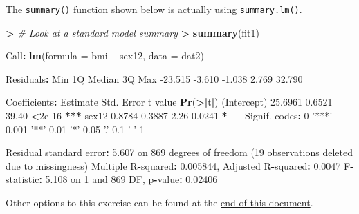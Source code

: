 \documentclass[
]{book}
\newenvironment{Shaded}{\begin{snugshade}}{\end{snugshade}}
\newcommand{\CommentTok}[1]{\textcolor[rgb]{0.56,0.35,0.01}{\textit{#1}}}
\newcommand{\DataTypeTok}[1]{\textcolor[rgb]{0.13,0.29,0.53}{#1}}
\newcommand{\DecValTok}[1]{\textcolor[rgb]{0.00,0.00,0.81}{#1}}
\newcommand{\ErrorTok}[1]{\textcolor[rgb]{0.64,0.00,0.00}{\textbf{#1}}}
\newcommand{\FloatTok}[1]{\textcolor[rgb]{0.00,0.00,0.81}{#1}}
\newcommand{\KeywordTok}[1]{\textcolor[rgb]{0.13,0.29,0.53}{\textbf{#1}}}
\newcommand{\NormalTok}[1]{#1}
\newcommand{\OperatorTok}[1]{\textcolor[rgb]{0.81,0.36,0.00}{\textbf{#1}}}
\newcommand{\StringTok}[1]{\textcolor[rgb]{0.31,0.60,0.02}{#1}}
\begin{document}
The \texttt{summary()} function shown below is actually using \texttt{summary.lm()}.

\begin{Shaded}
\begin{Highlighting}[]
\OperatorTok{>}\StringTok{ }\CommentTok{# Look at a standard model summary}
\ErrorTok{>}\StringTok{ }\KeywordTok{summary}\NormalTok{(fit1)}

\NormalTok{Call}\OperatorTok{:}
\KeywordTok{lm}\NormalTok{(}\DataTypeTok{formula =}\NormalTok{ bmi }\OperatorTok{~}\StringTok{ }\NormalTok{sex12, }\DataTypeTok{data =}\NormalTok{ dat2)}

\NormalTok{Residuals}\OperatorTok{:}
\StringTok{    }\NormalTok{Min      1Q  Median      3Q     Max }
\FloatTok{-23.515}  \FloatTok{-3.610}  \FloatTok{-1.038}   \FloatTok{2.769}  \FloatTok{32.790} 

\NormalTok{Coefficients}\OperatorTok{:}
\StringTok{            }\NormalTok{Estimate Std. Error t value }\KeywordTok{Pr}\NormalTok{(}\OperatorTok{>}\ErrorTok{|}\NormalTok{t}\OperatorTok{|}\NormalTok{)    }
\NormalTok{(Intercept)  }\FloatTok{25.6961}     \FloatTok{0.6521}   \FloatTok{39.40}   \OperatorTok{<}\FloatTok{2e-16} \OperatorTok{**}\ErrorTok{*}
\NormalTok{sex12         }\FloatTok{0.8784}     \FloatTok{0.3887}    \FloatTok{2.26}   \FloatTok{0.0241} \OperatorTok{*}\StringTok{  }
\OperatorTok{---}
\NormalTok{Signif. codes}\OperatorTok{:}\StringTok{  }\DecValTok{0} \StringTok{'***'} \FloatTok{0.001} \StringTok{'**'} \FloatTok{0.01} \StringTok{'*'} \FloatTok{0.05} \StringTok{'.'} \FloatTok{0.1} \StringTok{' '} \DecValTok{1}

\NormalTok{Residual standard error}\OperatorTok{:}\StringTok{ }\FloatTok{5.607}\NormalTok{ on }\DecValTok{869}\NormalTok{ degrees of freedom}
\NormalTok{  (}\DecValTok{19}\NormalTok{ observations deleted due to missingness)}
\NormalTok{Multiple R}\OperatorTok{-}\NormalTok{squared}\OperatorTok{:}\StringTok{  }\FloatTok{0.005844}\NormalTok{,  Adjusted R}\OperatorTok{-}\NormalTok{squared}\OperatorTok{:}\StringTok{  }\FloatTok{0.0047} 
\NormalTok{F}\OperatorTok{-}\NormalTok{statistic}\OperatorTok{:}\StringTok{ }\FloatTok{5.108}\NormalTok{ on }\DecValTok{1}\NormalTok{ and }\DecValTok{869}\NormalTok{ DF,  p}\OperatorTok{-}\NormalTok{value}\OperatorTok{:}\StringTok{ }\FloatTok{0.02406}
\end{Highlighting}
\end{Shaded}

Other options to this exercise can be found at the \protect\hyperlink{alt-model}{end of this document}.
\end{document}
